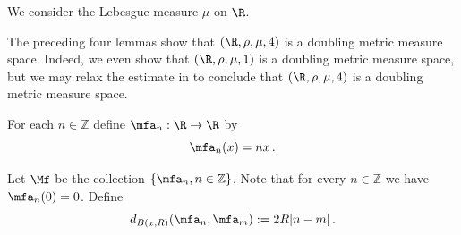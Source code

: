 We consider the Lebesgue measure $\mu$ on $\R$.






The preceding four lemmas show that $(\R, \rho, \mu, 4)$ is a doubling metric measure space. Indeed, we even show
that $(\R, \rho, \mu, 1)$ is a doubling metric measure space, but we may relax the estimate in  to conclude that $(\R, \rho, \mu, 4)$
is a doubling metric measure space.


For each $n\in \mathbb{Z}$ define
$\mfa_n:\R\to \R$ by
\begin{equation}
    \mfa_n(x)=nx\, .
\end{equation}


Let $\Mf$ be the collection $\{\mfa_n, n\in \mathbb{Z}\}$.
Note that for every $n\in \mathbb{Z}$ we have $\mfa_n(0)=0$.
Define
\begin{equation}
    \label{eqcarl4}
    d_{B(x,R)}(\mfa_n, \mfa_m) := 2R|n-m|\,.
\end{equation}

























\printbibliography

